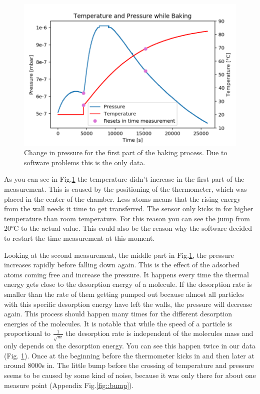 \documentclass[]{article}
\begin{document}
\begin{figure}[h]
\centering\includegraphics[width=.75\textwidth]{Plots/Baking.png}
\caption{Change in pressure for the first part of the baking process. Due to software problems this is the only data.}
\label{fig::baking}
\end{figure}

As you can see in Fig.\ref{fig::baking} the temperature didn't increase in the first part of the measurement. This is caused by the positioning of the thermometer, which was placed in the center of the chamber. Less atoms means that the rising energy from the wall needs it time to get transferred. 
The sensor only kicks in for higher temperature than room temperature. For this reason you can see the jump from 20°C to the actual value. This could also be the reason why the software decided to restart the time measurement at this moment. 

Looking at the second measurement, the middle part in Fig.\ref{fig::baking}, the pressure increases rapidly before falling down again. This is the effect of the adsorbed atoms coming free and increase the pressure. It happens every time the thermal energy gets close to the desorption energy of a molecule. If the desorption rate is smaller than the rate of them getting pumped out because almost all particles with this specific desorption energy have left the walls, the pressure will decrease again. This process should happen many times for the different desorption energies of the molecules. It is notable that while the speed of a particle is proportional to $\frac{1}{\sqrt{m}} $ the desorption rate is independent of the molecules mass and only depends on the desorption energy.
You can see this happen twice in our data (Fig. \ref{fig::baking}). Once at the beginning before the thermometer kicks in and then later at around 8000s in. The little bump before the crossing of temperature and pressure seems to be caused by some kind of noise, because it was only there for about one measure point (Appendix Fig.\ref{fig::bump}).
\end{document}
